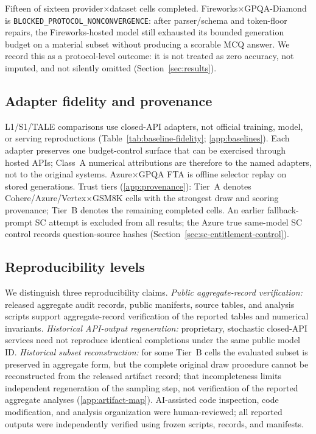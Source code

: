 Fifteen of sixteen provider$\times$dataset cells completed. Fireworks$\times$GPQA-Diamond is
\texttt{BLOCKED\_PROTOCOL\_NONCONVERGENCE}: after parser/schema and token-floor repairs, the
Fireworks-hosted model still exhausted its bounded generation budget on a material subset without
producing a scorable MCQ answer. We record this as a protocol-level outcome: it is not treated as
zero accuracy, not imputed, and not silently omitted (Section~\ref{sec:results}).

\subsection{Adapter fidelity and provenance}
\label{sec:setup-baselines}

L1/S1/TALE comparisons use closed-API adapters, not official training, model, or serving
reproductions (Table~\ref{tab:baseline-fidelity}; \ref{app:baselines}). Each adapter preserves one
budget-control surface that can be exercised through hosted APIs; Class~A numerical attributions are
therefore to the named adapters, not to the original systems. Azure$\times$GPQA FTA is offline
selector replay on stored generations.
Trust tiers (\ref{app:provenance}): Tier~A denotes Cohere/Azure/Vertex$\times$GSM8K cells
with the strongest draw and scoring provenance; Tier~B denotes the remaining completed cells. An
earlier fallback-prompt SC attempt is excluded from all results; the Azure true same-model SC
control records question-source hashes (Section~\ref{sec:sc-entitlement-control}).

\begin{table}[h]
\centering
\caption{Baseline fidelity disclosure for closed-API adapters. Numerical claims in this manuscript
apply to the evaluated adapter surfaces, not to the original L1, s1, or TALE systems.}
\label{tab:baseline-fidelity}

\end{table}

\subsection{Reproducibility levels}
\label{sec:setup-repro}

We distinguish three reproducibility claims. \emph{Public aggregate-record verification:} released
aggregate audit records, public manifests, source tables, and analysis scripts support
aggregate-record verification of the reported tables and numerical invariants. \emph{Historical
API-output regeneration:}
proprietary, stochastic closed-API services need not reproduce identical completions under the same
public model ID. \emph{Historical subset reconstruction:} for some Tier~B cells the evaluated subset
is preserved in aggregate form, but the complete original draw procedure cannot be reconstructed from
the released artifact record; that incompleteness limits independent regeneration of the sampling
step, not verification of the reported aggregate analyses (\ref{app:artifact-map}). AI-assisted code
inspection, code modification, and analysis organization were human-reviewed; all reported outputs
were independently verified using frozen scripts, records, and manifests.
